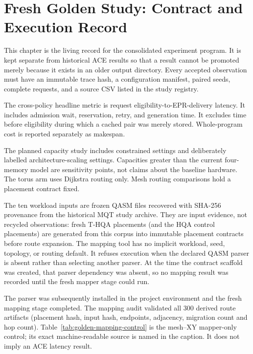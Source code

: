 \chapter{Fresh Golden Study: Contract and Execution Record}

This chapter is the living record for the consolidated experiment program. It is
kept separate from historical ACE results so that a result cannot be promoted merely
because it exists in an older output directory. Every accepted observation must have
an immutable trace hash, a configuration manifest, paired seeds, complete requests,
and a source CSV listed in the study registry.

The cross-policy headline metric is request eligibility-to-EPR-delivery latency. It
includes admission wait, reservation, retry, and generation time. It excludes time
before eligibility during which a cached pair was merely stored. Whole-program cost
is reported separately as makespan.



The planned capacity study includes constrained settings and deliberately labelled
architecture-scaling settings. Capacities greater than the current four-memory model
are sensitivity points, not claims about the baseline hardware. The torus arm uses
Dijkstra routing only. Mesh routing comparisons hold a placement contract fixed.

The ten workload inputs are frozen QASM files recovered with SHA-256 provenance
from the historical MQT study archive. They are input evidence, not recycled
observations: fresh T-HQA placements (and the HQA control placements) are generated
from this corpus into immutable placement contracts before route expansion. The
mapping tool has no implicit workload, seed, topology, or routing default. It refuses
execution when the declared QASM parser is absent rather than selecting another
parser. At the time the contract scaffold was created, that parser dependency was
absent, so no mapping result was recorded until the fresh mapper stage could run.

The parser was subsequently installed in the project environment and the fresh
mapping stage completed. The mapping audit validated all 300 derived route
artifacts (placement hash, input hash, endpoints, adjacency, migration count and
hop count). Table~\ref{tab:golden-mapping-control} is the mesh--XY mapper-only
control; its exact machine-readable source is named in the caption. It does not
imply an ACE latency result.


